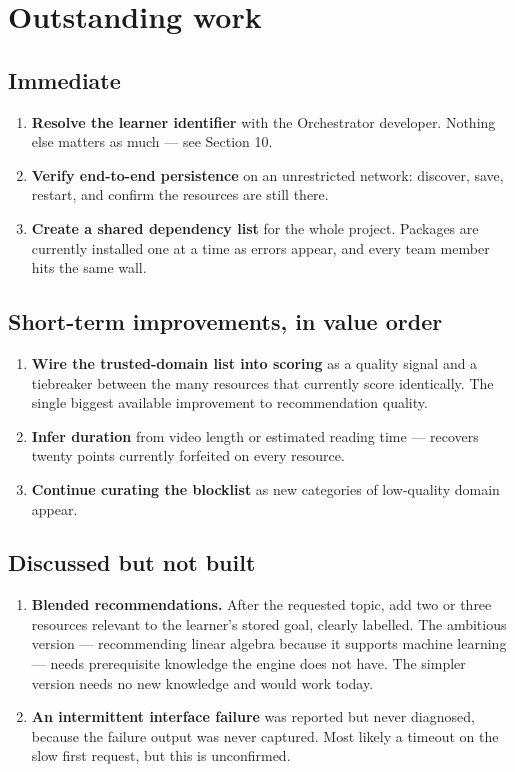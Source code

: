 \documentclass[11pt,a4paper]{article}
\begin{document}
\section{Outstanding work}

\subsection{Immediate}

\begin{enumerate}
\item \textbf{Resolve the learner identifier} with the Orchestrator developer.
Nothing else matters as much --- see Section 10.
\item \textbf{Verify end-to-end persistence} on an unrestricted network:
discover, save, restart, and confirm the resources are still there.
\item \textbf{Create a shared dependency list} for the whole project. Packages
are currently installed one at a time as errors appear, and every team member
hits the same wall.
\end{enumerate}

\subsection{Short-term improvements, in value order}

\begin{enumerate}
\item \textbf{Wire the trusted-domain list into scoring} as a quality signal
and a tiebreaker between the many resources that currently score identically.
The single biggest available improvement to recommendation quality.
\item \textbf{Infer duration} from video length or estimated reading time ---
recovers twenty points currently forfeited on every resource.
\item \textbf{Continue curating the blocklist} as new categories of
low-quality domain appear.
\end{enumerate}

\subsection{Discussed but not built}

\begin{enumerate}
\item \textbf{Blended recommendations.} After the requested topic, add two or
three resources relevant to the learner's stored goal, clearly labelled. The
ambitious version --- recommending linear algebra because it supports machine
learning --- needs prerequisite knowledge the engine does not have. The
simpler version needs no new knowledge and would work today.
\item \textbf{An intermittent interface failure} was reported but never
diagnosed, because the failure output was never captured. Most likely a
timeout on the slow first request, but this is unconfirmed.
\end{enumerate}
\end{document}
